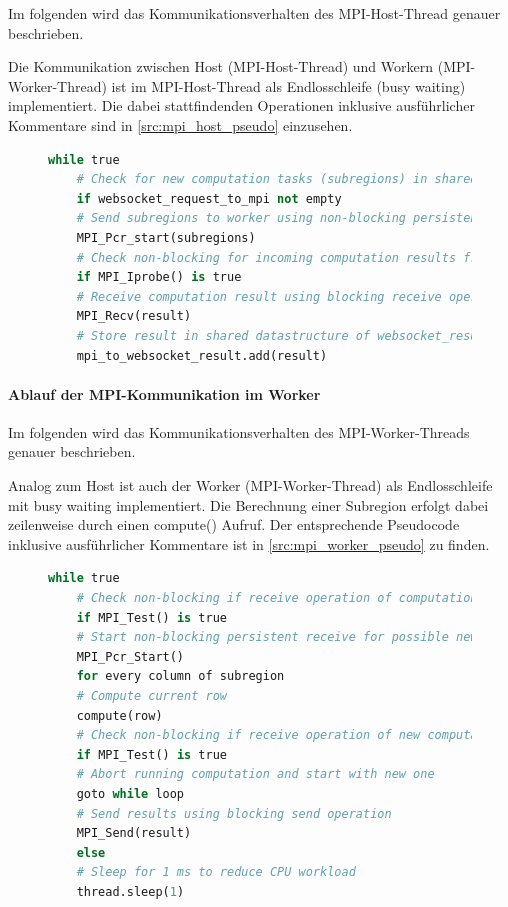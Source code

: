 Im folgenden wird das Kommunikationsverhalten des MPI-Host-Thread genauer beschrieben.


Die Kommunikation zwischen Host (MPI-Host-Thread) und Workern (MPI-Worker-Thread) ist im MPI-Host-Thread als Endlosschleife (busy waiting) implementiert. Die dabei stattfindenden Operationen inklusive ausführlicher Kommentare sind in \autoref{src:mpi_host_pseudo} einzusehen.

\begin{figure}[!h]
	\begin{lstlisting}[language=python, caption={MPI Kommunikation im Host in Pseudocode}, label={src:mpi_host_pseudo}]
	while true
	# Check for new computation tasks (subregions) in shared datastructure of websocket_recv_thread
	if websocket_request_to_mpi not empty
	# Send subregions to worker using non-blocking persistent communication request
	MPI_Pcr_start(subregions)
	# Check non-blocking for incoming computation results from worker
	if MPI_Iprobe() is true
	# Receive computation result using blocking receive operation
	MPI_Recv(result)
	# Store result in shared datastructure of websocket_result_thread
	mpi_to_websocket_result.add(result)
	\end{lstlisting}
\end{figure}

\paragraph{Ablauf der MPI-Kommunikation im Worker}\label{para:impl_mpi_worker}

Im folgenden wird das Kommunikationsverhalten des MPI-Worker-Threads genauer beschrieben. 

Analog zum Host ist auch der Worker (MPI-Worker-Thread) als Endlosschleife mit busy waiting implementiert. Die Berechnung einer Subregion erfolgt dabei zeilenweise durch einen compute() Aufruf. Der entsprechende Pseudocode inklusive ausführlicher Kommentare ist in \autoref{src:mpi_worker_pseudo} zu finden.

\begin{figure}[!h]
	\begin{lstlisting}[language=python, caption={MPI Kommunikation im Worker in Pseudocode}, label={src:mpi_worker_pseudo}]
	while true
	# Check non-blocking if receive operation of computation task (subregion) is complete
	if MPI_Test() is true
	# Start non-blocking persistent receive for possible new computation task
	MPI_Pcr_Start()
	for every column of subregion
	# Compute current row
	compute(row)
	# Check non-blocking if receive operation of new computation task (subregion) is complete
	if MPI_Test() is true
	# Abort running computation and start with new one
	goto while loop
	# Send results using blocking send operation
	MPI_Send(result)
	else
	# Sleep for 1 ms to reduce CPU workload
	thread.sleep(1)
	\end{lstlisting}
\end{figure}


